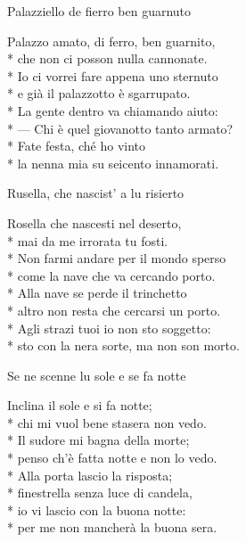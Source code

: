 \documentclass[11pt]{book}
\begin{document}
\begin{poem}{Palazziello de fierro ben guarnuto}{}
\settowidth{\versewidth}{Palazzo amato, di ferro, ben guarnito}
\begin{altverse}
Palazzo amato, di ferro, ben guarnito,\\*
che non ci posson nulla cannonate.\\*
Io ci vorrei fare appena uno sternuto\\*
e già il palazzotto è sgarrupato.\\*
La gente dentro va chiamando aiuto:\\*
— Chi è quel giovanotto tanto armato?\\*
Fate festa, ché ho vinto\\*
la nenna mia su seicento innamorati.
\end{altverse}
\end{poem}

\begin{poem}{Rusella, che nascist’ a lu risierto}{}
\settowidth{\versewidth}{Sto con la nera sorte, ma non son morto}
\begin{altverse}
Rosella che nascesti nel deserto,\\*
mai da me irrorata tu fosti.\\*
Non farmi andare per il mondo sperso\\*
come la nave che va cercando porto.\\*
Alla nave se perde il trinchetto\\*
altro non resta che cercarsi un porto.\\*
Agli strazi tuoi io non sto soggetto:\\*
sto con la nera sorte, ma non son morto.
\end{altverse}
\end{poem}

\begin{poem}{Se ne scenne lu sole e se fa notte}{}
\settowidth{\versewidth}{Penso ch’è fatta notte e non lo vedo}
\begin{altverse}
Inclina il sole e si fa notte;\\*
chi mi vuol bene stasera non vedo.\\*
Il sudore mi bagna della morte;\\*
penso ch’è fatta notte e non lo vedo.\\*
Alla porta lascio la risposta;\\*
finestrella senza luce di candela,\\*
io vi lascio con la buona notte:\\*
per me non mancherà la buona sera.
\end{altverse}
\end{poem}
\end{document}
